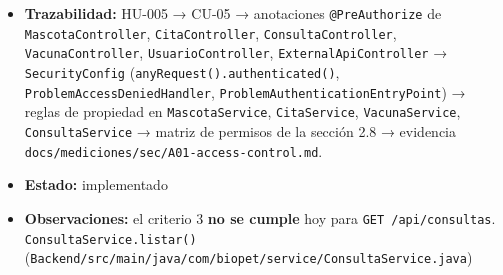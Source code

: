 \documentclass[
  spanish,
]{article}
\begin{document}
\begin{itemize}
  \texttt{dueno\allowbreak{}No\allowbreak{}Puede\allowbreak{}Consultar\allowbreak{}Cita\allowbreak{}De\allowbreak{}Mascota\allowbreak{}Ajena};
  \texttt{Vacuna\allowbreak{}Controller\allowbreak{}Test.\allowbreak{}dueno\allowbreak{}Solo\allowbreak{}Ve\allowbreak{}Vacunas\allowbreak{}De\allowbreak{}Sus\allowbreak{}Propias\allowbreak{}Mascotas},
  \texttt{dueno\allowbreak{}Consulta\allowbreak{}Vacuna\allowbreak{}De\allowbreak{}Mascota\allowbreak{}Ajena\allowbreak{}Devuelve403};
  \texttt{Usuario\allowbreak{}Controller\allowbreak{}Test.\allowbreak{}acceso\allowbreak{}Con\allowbreak{}Rol\allowbreak{}No\allowbreak{}Admin\allowbreak{}Devuelve403},
  \texttt{acceso\allowbreak{}Sin\allowbreak{}Autenticacion\allowbreak{}Devuelve401}; y captura HTTP real
  end-to-end en \texttt{docs/\allowbreak{}mediciones/\allowbreak{}sec/\allowbreak{}A01-\allowbreak{}access-\allowbreak{}control.\allowbreak{}md} con
  \texttt{docs/\allowbreak{}mediciones/\allowbreak{}sec/\allowbreak{}raw/\allowbreak{}A01-\allowbreak{}access-\allowbreak{}control.\allowbreak{}txt} (IDOR entre
  dos dueños reales sobre TLS).
\item
  \textbf{Trazabilidad:} HU-005 → CU-05 → anotaciones
  \texttt{@Pre\allowbreak{}Authorize} de \texttt{Mascota\allowbreak{}Controller},
  \texttt{Cita\allowbreak{}Controller}, \texttt{Consulta\allowbreak{}Controller},
  \texttt{Vacuna\allowbreak{}Controller}, \texttt{Usuario\allowbreak{}Controller},
  \texttt{External\allowbreak{}Api\allowbreak{}Controller} → \texttt{Security\allowbreak{}Config}
  (\texttt{any\allowbreak{}Request().\allowbreak{}authenticated()},
  \texttt{Problem\allowbreak{}Access\allowbreak{}Denied\allowbreak{}Handler},
  \texttt{Problem\allowbreak{}Authentication\allowbreak{}Entry\allowbreak{}Point}) → reglas de propiedad en
  \texttt{Mascota\allowbreak{}Service}, \texttt{Cita\allowbreak{}Service}, \texttt{Vacuna\allowbreak{}Service},
  \texttt{Consulta\allowbreak{}Service} → matriz de permisos de la sección 2.8 →
  evidencia \texttt{docs/\allowbreak{}mediciones/\allowbreak{}sec/\allowbreak{}A01-\allowbreak{}access-\allowbreak{}control.\allowbreak{}md}.
\item
  \textbf{Estado:} implementado
\item
  \textbf{Observaciones:} el criterio 3 \textbf{no se cumple} hoy para
  \texttt{GET\ /\allowbreak{}api/\allowbreak{}consultas}. \texttt{Consulta\allowbreak{}Service.\allowbreak{}listar()}
  (\texttt{Backend/\allowbreak{}src/\allowbreak{}main/\allowbreak{}java/\allowbreak{}com/\allowbreak{}biopet/\allowbreak{}service/\allowbreak{}Consulta\allowbreak{}Service.\allowbreak{}java})

\end{itemize}
\end{document}
